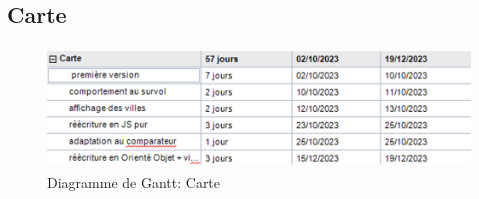 \documentclass[mstat,12pt]{unswthesis}
\begin{document}
\begin{adjustwidth}{-2cm}{}
\newpage

\hypertarget{carte}{%
\section{Carte}\label{carte}}

\begin{figure}
\centering
\includegraphics[width=12cm,height=3.21cm]{images/map_gantt.png}
\caption{Diagramme de Gantt: Carte}
\end{figure}


\end{adjustwidth}
\end{document}
